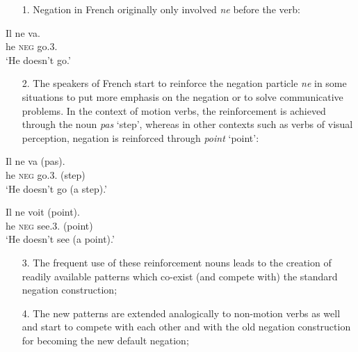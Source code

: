 \begin{enumerate}  \item[1.]  Negation in French originally only involved {\em ne} before the verb:
\end{enumerate}
 
\ea
\gll Il ne va.\\
he {\textsc{neg}} go.3{\sg}.{\prs}\\
\glt `He doesn't go.'\\
\z

\begin{enumerate}  \item[2.]  The speakers of French start to reinforce the negation particle {\em ne} in some situations to put more emphasis on the negation or to solve communicative problems. In the context of motion verbs, the reinforcement is achieved through the noun {\em pas} `step', whereas in other contexts such as verbs of visual perception, negation is reinforced through {\em point} `point':

\end{enumerate}
  
\ea
\gll Il ne va (pas).\\
he {\textsc{neg}} go.3{\sg}.{\prs} (step)\\
\glt `He doesn't go (a step).'\\

\item
\gll Il ne voit (point).\\
he {\textsc{neg}} see.3{\sg}.{\prs} (point)\\
\glt `He doesn't see (a point).'\\
\z

\begin{enumerate}  \item[3.]   The frequent use of these reinforcement nouns leads to the creation of readily available patterns which co-exist (and compete with) the standard negation construction;
\end{enumerate}


\begin{enumerate}  \item[4.]  The new patterns are extended analogically to non-motion verbs as well and start to compete with each other and with the old negation construction for becoming the new default negation;

\end{enumerate}



